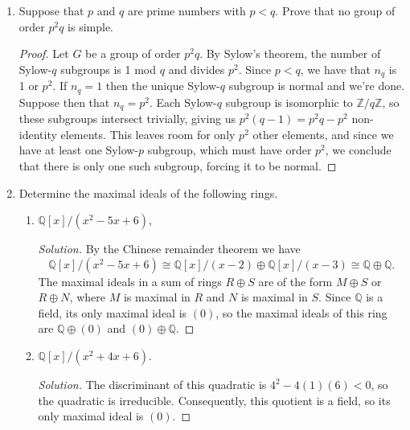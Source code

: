 \documentclass[11pt,letterpaper]{report}
\newcommand{\integers}{\mathbb{Z}}
\newcommand{\rationals}{\mathbb{Q}}
\newenvironment{solution}
{\begin{proof}[Solution]}
{\end{proof}}
\begin{document}
\begin{enumerate}
	\item Suppose that $p$ and $q$ are prime numbers with $p<q$. Prove that no group of order $p^2q$ is simple.
	\begin{proof}
		Let $G$ be a group of order $p^2q$. By Sylow's theorem, the number of Sylow-$q$ subgroups is 1 mod $q$ and divides $p^2$. Since $p<q$, we have that $n_q$ is 1 or $p^2$. If $n_q = 1$ then the unique Sylow-$q$ subgroup is normal and we're done. Suppose then that $n_q = p^2$. Each Sylow-$q$ subgroup is isomorphic to $\integers/q\integers$, so these subgroups intersect trivially, giving us $p^2(q-1) = p^2q-p^2$ non-identity elements. This leaves room for only $p^2$ other elements, and since we have at least one Sylow-$p$ subgroup, which must have order $p^2$, we conclude that there is only one such subgroup, forcing it to be normal.
	\end{proof}

	\item Determine the maximal ideals of the following rings.
	\begin{enumerate}
		\item $\rationals[x]/(x^2-5x+6)$,
		\begin{solution}
			By the Chinese remainder theorem we have
			\[
			\rationals[x]/(x^2-5x+6) \cong \rationals[x]/(x-2) \oplus \rationals[x]/(x-3) \cong \rationals \oplus \rationals.
			\]
			The maximal ideals in a sum of rings $R\oplus S$ are of the form $M\oplus S$ or $R\oplus N$, where $M$ is maximal in $R$ and $N$ is maximal in $S$. Since $\rationals$ is a field, its only maximal ideal is $(0)$, so the maximal ideals of this ring are $\rationals\oplus (0)$ and $(0)\oplus \rationals$.
		\end{solution}
		\item $\rationals[x]/(x^2+4x+6)$.
		\begin{solution}
			The discriminant of this quadratic is $4^2-4(1)(6)<0$, so the quadratic is irreducible. Consequently, this quotient is a field, so its only maximal ideal is $(0)$.
		\end{solution}
	\end{enumerate}


\end{enumerate}
\end{document}
